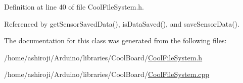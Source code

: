 Definition at line 40 of file Cool\+File\+System.\+h.



Referenced by get\+Sensor\+Saved\+Data(), is\+Data\+Saved(), and save\+Sensor\+Data().



The documentation for this class was generated from the following files\+:\begin{DoxyCompactItemize}
\item 
/home/ashiroji/\+Arduino/libraries/\+Cool\+Board/\hyperlink{CoolFileSystem_8h}{Cool\+File\+System.\+h}\item 
/home/ashiroji/\+Arduino/libraries/\+Cool\+Board/\hyperlink{CoolFileSystem_8cpp}{Cool\+File\+System.\+cpp}\end{DoxyCompactItemize}
